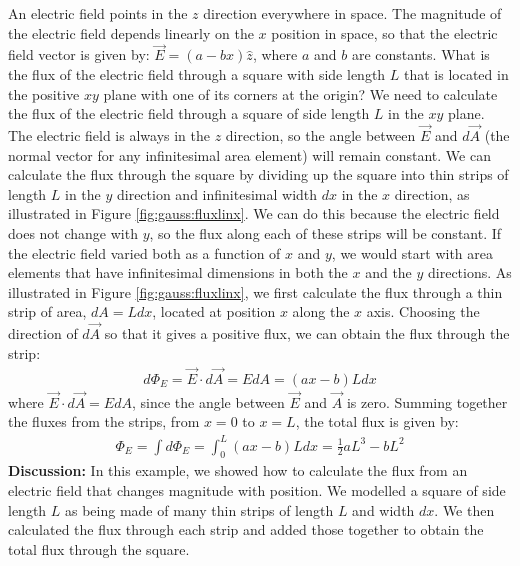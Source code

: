 \begin{example}{An electric field points in the $z$ direction everywhere in space. The magnitude of the electric field depends linearly on the $x$ position in space, so that the electric field vector is given by: $\vec E=(a-bx)\hat z$, where $a$ and $b$ are constants. What is the flux of the electric field through a square with side length $L$ that is located in the positive $xy$ plane with one of its corners at the origin?}
We need to calculate the flux of the electric field through a square of side length $L$ in the $xy$ plane. The electric field is always in the $z$ direction, so the angle between $\vec E$ and $d\vec A$ (the normal vector for any infinitesimal area element) will remain constant. We can calculate the flux through the square by dividing up the square into thin strips of length $L$ in the $y$ direction and infinitesimal width $dx$ in the $x$ direction, as illustrated in Figure \ref{fig:gauss:fluxlinx}. We can do this because the electric field does not change with $y$, so the flux along each of these strips will be constant. If the electric field varied both as a function of $x$ and $y$, we would start with area elements that have infinitesimal dimensions in both the $x$ and the $y$ directions. 
As illustrated in Figure \ref{fig:gauss:fluxlinx}, we first calculate the flux through a thin strip of area, $dA=Ldx$, located at position $x$ along the $x$ axis. Choosing the direction of $d\vec A$ so that it gives a positive flux, we can obtain the flux through the strip:
\begin{align*}
d\Phi_E=\vec E\cdot d\vec A=EdA=(ax-b)Ldx
\end{align*}
where $\vec E\cdot d\vec A=EdA$, since the angle between $\vec E$ and $\vec A$ is zero. Summing together the fluxes from the strips, from $x=0$ to $x=L$, the total flux is given by:
\begin{align*}
\Phi_E=\int d\Phi_E=\int_0^L(ax-b)Ldx=\frac{1}{2}aL^3-bL^2
\end{align*}
\textbf{Discussion:} In this example, we showed how to calculate the flux from an electric field that changes magnitude with position. We modelled a square of side length $L$ as being made of many thin strips of length $L$ and width $dx$. We then calculated the flux through each strip and added those together to obtain the total flux through the square.
\end{example}
